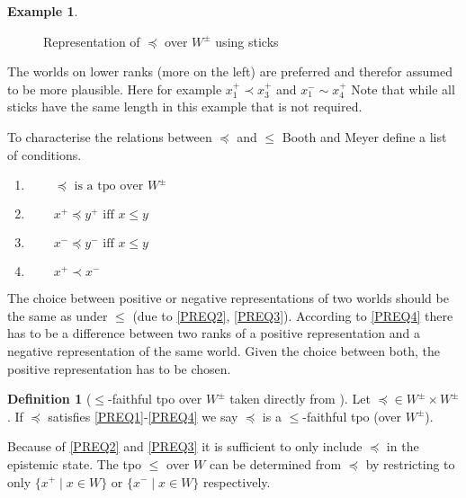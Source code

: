 \documentclass[english, 12pt]{scrartcl}
\theoremstyle{definition}
\newtheorem{example}{Example}[section]
\theoremstyle{definition}
\newtheorem{definition}{Definition}
\theoremstyle{definition}
\begin{document}
\begin{example}
\begin{figure}[h]
        \caption{Representation of $\preceq$ over $W^{\pm}$ using sticks}
        \label{fig:example-visualisation-scatterplot}
    \end{figure}
    
   The worlds on lower ranks (more on the left) are preferred and therefor assumed to be more plausible. Here for example $x_{1}^{+} \prec x_{3}^{+}$ and $x_{1}^{-} \sim x_{4}^{+}$ Note that while all sticks have the same length in this example that is not required.
\end{example}

To characterise the relations between $\preceq$ and $\leq$ Booth and Meyer define a list of conditions.

\begin{enumerate}[wide=0pt, widest=99,leftmargin=\parindent,label = ($\preceq\arabic*$)]
    \item\label{PREQ1} $\qquad \preceq \textrm{ is a tpo over } W^{\pm}$
    \item\label{PREQ2} $\qquad x^{+} \preceq y^{+} \textrm{ iff } x \leq y$
    \item\label{PREQ3} $\qquad x^{-} \preceq y^{-} \textrm{ iff } x \leq y$
    \item\label{PREQ4} $\qquad x^{+} \prec x^{-}$
\end{enumerate}

The choice between positive or negative representations of two worlds should be the same as under $\leq$ (due to \ref{PREQ2}, \ref{PREQ3}). According to \ref{PREQ4} there has to be a difference between two ranks of a positive representation and a negative representation of the same world. Given the choice between both, the positive representation has to be chosen.

\begin{definition}[$\leq$-faithful tpo over $W^{\pm}$ taken directly from \cite{Booth2011}]
\label{definition:faithful-tpo}Let $\preceq \in W^{\pm} \times W^{\pm}$. If $\preceq$ satisfies \ref{PREQ1}-\ref{PREQ4} we say $\preceq$ is a $\leq$-faithful tpo (over $W^{\pm}$).
\end{definition}

Because of \ref{PREQ2} and \ref{PREQ3} it is sufficient to only include $\preceq$ in the epistemic state. The tpo $\leq$ over $W$ can be determined from $\preceq$ by restricting to only $\{ x^{+} \mid x \in W\}$ or $\{ x^{-} \mid x \in W\}$ respectively.
\end{document}
